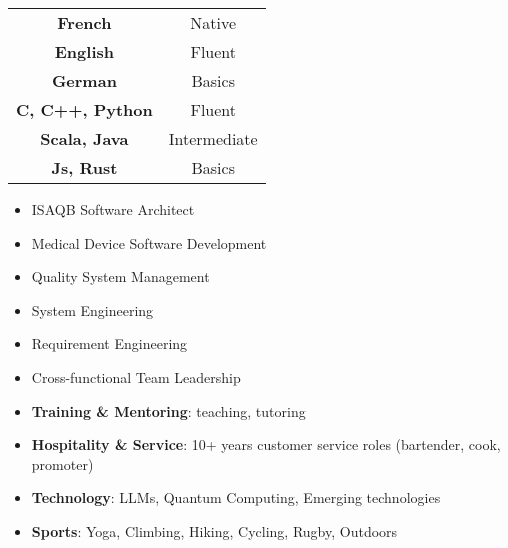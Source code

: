 %
%
%

\threecolumnsection
{
\vspace{1em}
\hspace*{-5mm}\begin{tabular}{cc}
  \textbf{French}  & Native \\
  \textbf{English}   & Fluent \\
  \textbf{German} & Basics \\
  \textbf{C, C++, Python} & Fluent \\
  \textbf{Scala, Java} & Intermediate \\
  \textbf{Js, Rust} & Basics
\end{tabular}
}
{
\vspace{1em}
\begin{itemize}
    \item ISAQB Software Architect
	\item Medical Device Software Development
    \item Quality System Management
    \item System Engineering
    \item Requirement Engineering
    \item Cross-functional Team Leadership
\end{itemize}
}
{
\vspace{1em}
\hspace*{-5mm}\begin{itemize}
	\item \textbf{Training \& Mentoring}: teaching, tutoring
	\item \textbf{Hospitality \& Service}: 10+ years customer service roles (bartender, cook, promoter)
    \item \textbf{Technology}: LLMs, Quantum Computing, Emerging technologies
    \item \textbf{Sports}: Yoga, Climbing, Hiking, Cycling, Rugby, Outdoors
\end{itemize}
}

